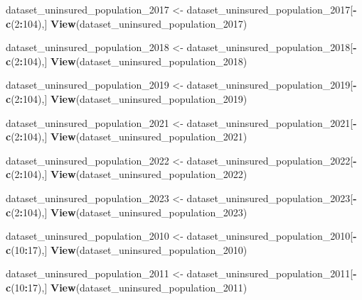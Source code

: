 \documentclass[
]{article}
\newenvironment{Shaded}{\begin{snugshade}}{\end{snugshade}}
\newcommand{\DecValTok}[1]{\textcolor[rgb]{0.00,0.00,0.81}{#1}}
\newcommand{\FunctionTok}[1]{\textcolor[rgb]{0.13,0.29,0.53}{\textbf{#1}}}
\newcommand{\NormalTok}[1]{#1}
\newcommand{\OtherTok}[1]{\textcolor[rgb]{0.56,0.35,0.01}{#1}}
\newcommand{\SpecialCharTok}[1]{\textcolor[rgb]{0.81,0.36,0.00}{\textbf{#1}}}
\begin{document}
\begin{Shaded}
\begin{Highlighting}[]
\NormalTok{dataset\_uninsured\_population\_2017 }\OtherTok{\textless{}{-}}\NormalTok{ dataset\_uninsured\_population\_2017[}\SpecialCharTok{{-}}\FunctionTok{c}\NormalTok{(}\DecValTok{2}\SpecialCharTok{:}\DecValTok{104}\NormalTok{),]}
\FunctionTok{View}\NormalTok{(dataset\_uninsured\_population\_2017)}

\NormalTok{dataset\_uninsured\_population\_2018 }\OtherTok{\textless{}{-}}\NormalTok{ dataset\_uninsured\_population\_2018[}\SpecialCharTok{{-}}\FunctionTok{c}\NormalTok{(}\DecValTok{2}\SpecialCharTok{:}\DecValTok{104}\NormalTok{),]}
\FunctionTok{View}\NormalTok{(dataset\_uninsured\_population\_2018)}

\NormalTok{dataset\_uninsured\_population\_2019 }\OtherTok{\textless{}{-}}\NormalTok{ dataset\_uninsured\_population\_2019[}\SpecialCharTok{{-}}\FunctionTok{c}\NormalTok{(}\DecValTok{2}\SpecialCharTok{:}\DecValTok{104}\NormalTok{),]}
\FunctionTok{View}\NormalTok{(dataset\_uninsured\_population\_2019)}

\NormalTok{dataset\_uninsured\_population\_2021 }\OtherTok{\textless{}{-}}\NormalTok{ dataset\_uninsured\_population\_2021[}\SpecialCharTok{{-}}\FunctionTok{c}\NormalTok{(}\DecValTok{2}\SpecialCharTok{:}\DecValTok{104}\NormalTok{),]}
\FunctionTok{View}\NormalTok{(dataset\_uninsured\_population\_2021)}

\NormalTok{dataset\_uninsured\_population\_2022 }\OtherTok{\textless{}{-}}\NormalTok{ dataset\_uninsured\_population\_2022[}\SpecialCharTok{{-}}\FunctionTok{c}\NormalTok{(}\DecValTok{2}\SpecialCharTok{:}\DecValTok{104}\NormalTok{),]}
\FunctionTok{View}\NormalTok{(dataset\_uninsured\_population\_2022)}

\NormalTok{dataset\_uninsured\_population\_2023 }\OtherTok{\textless{}{-}}\NormalTok{ dataset\_uninsured\_population\_2023[}\SpecialCharTok{{-}}\FunctionTok{c}\NormalTok{(}\DecValTok{2}\SpecialCharTok{:}\DecValTok{104}\NormalTok{),]}
\FunctionTok{View}\NormalTok{(dataset\_uninsured\_population\_2023)}

\NormalTok{dataset\_uninsured\_population\_2010 }\OtherTok{\textless{}{-}}\NormalTok{ dataset\_uninsured\_population\_2010[}\SpecialCharTok{{-}}\FunctionTok{c}\NormalTok{(}\DecValTok{10}\SpecialCharTok{:}\DecValTok{17}\NormalTok{),]}
\FunctionTok{View}\NormalTok{(dataset\_uninsured\_population\_2010)}

\NormalTok{dataset\_uninsured\_population\_2011 }\OtherTok{\textless{}{-}}\NormalTok{ dataset\_uninsured\_population\_2011[}\SpecialCharTok{{-}}\FunctionTok{c}\NormalTok{(}\DecValTok{10}\SpecialCharTok{:}\DecValTok{17}\NormalTok{),]}
\FunctionTok{View}\NormalTok{(dataset\_uninsured\_population\_2011)}


\end{Highlighting}
\end{Shaded}
\end{document}
